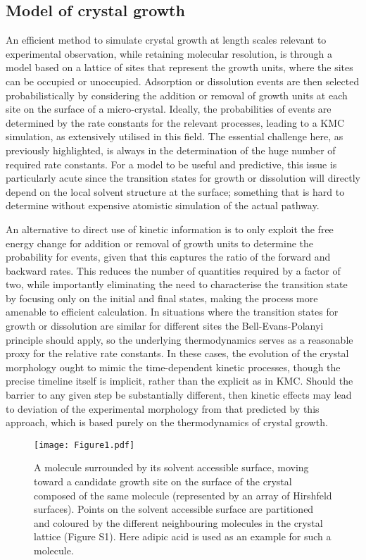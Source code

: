 \documentclass[twoside,twocolumn,9pt]{article}
\begin{document}
\subsection{Model of crystal growth}
An efficient method to simulate crystal growth at length scales relevant to experimental observation, while retaining molecular resolution, is through a model based on a lattice of sites that represent the growth units, where the sites can be occupied or unoccupied. Adsorption or dissolution events are then selected probabilistically by considering the addition or removal of growth units at each site on the surface of a micro-crystal. Ideally, the probabilities of events are determined by the rate constants for the relevant processes, leading to a KMC simulation, as extensively utilised in this field.\cite{Rak2001,Andersen2019}
The essential challenge here, as previously highlighted, is always in the determination of the huge number of required rate constants. For a model to be useful and predictive, this issue is particularly acute since the transition states for growth or dissolution will directly depend on the local solvent structure at the surface; something that is hard to determine without expensive atomistic simulation of the actual pathway.

An alternative to direct use of kinetic information is to only exploit the free energy change for addition or removal of growth units to determine the probability for events, given that this captures the ratio of the forward and backward rates.
This reduces the number of quantities required by a factor of two, while importantly eliminating the need to characterise the transition state by focusing only on the initial and final states, making the process more amenable to efficient calculation. In situations where the transition states for growth or dissolution are similar for different sites the Bell-Evans-Polanyi principle\cite{Bell1936,Evans1936} should apply, so the underlying thermodynamics serves as a reasonable proxy for the relative rate constants. In these cases, the evolution of the crystal morphology ought to mimic the time-dependent kinetic processes, though the precise timeline itself is implicit, rather than the explicit as in KMC. Should the barrier to any given step be substantially different, then kinetic effects may lead to deviation of the experimental morphology from that predicted by this approach, which is based purely on the thermodynamics of crystal growth.

\begin{figure*}
\centering
  \texttt{[image: Figure1.pdf]}
  \caption{A molecule surrounded by its solvent accessible surface, moving toward a candidate growth site on the surface of the crystal composed of the same molecule (represented by an array of Hirshfeld surfaces). Points on the solvent accessible surface are partitioned and coloured by the different neighbouring molecules in the crystal lattice (Figure S1). 
  Here adipic acid is used as an example for such a molecule.}
  \label{fig:figure1}
\end{figure*}
\end{document}
